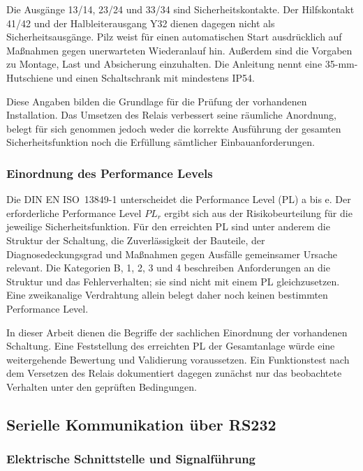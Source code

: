 Die Ausgänge 13/14, 23/24 und 33/34 sind Sicherheitskontakte. Der Hilfskontakt 41/42 und der Halbleiterausgang Y32 dienen dagegen nicht als Sicherheitsausgänge. Pilz weist für einen automatischen Start ausdrücklich auf Maßnahmen gegen unerwarteten Wiederanlauf hin. Außerdem sind die Vorgaben zu Montage, Last und Absicherung einzuhalten. Die Anleitung nennt eine 35-mm-Hutschiene und einen Schaltschrank mit mindestens IP54. \cite[Abschn.~Installation, Wiring und Connection]{pilz_pnoz_s4_grundlagen}

Diese Angaben bilden die Grundlage für die Prüfung der vorhandenen Installation. Das Umsetzen des Relais verbessert seine räumliche Anordnung, belegt für sich genommen jedoch weder die korrekte Ausführung der gesamten Sicherheitsfunktion noch die Erfüllung sämtlicher Einbauanforderungen.

\subsubsection{Einordnung des Performance Levels}

Die DIN EN ISO~13849-1 unterscheidet die Performance Level (PL) a bis e. Der erforderliche Performance Level $PL_r$ ergibt sich aus der Risikobeurteilung für die jeweilige Sicherheitsfunktion. Für den erreichten PL sind unter anderem die Struktur der Schaltung, die Zuverlässigkeit der Bauteile, der Diagnosedeckungsgrad und Maßnahmen gegen Ausfälle gemeinsamer Ursache relevant. Die Kategorien B, 1, 2, 3 und 4 beschreiben Anforderungen an die Struktur und das Fehlerverhalten; sie sind nicht mit einem PL gleichzusetzen. Eine zweikanalige Verdrahtung allein belegt daher noch keinen bestimmten Performance Level. \cite[Kap.~5, 7 und 8]{ifa_report_2025}

In dieser Arbeit dienen die Begriffe der sachlichen Einordnung der vorhandenen Schaltung. Eine Feststellung des erreichten PL der Gesamtanlage würde eine weitergehende Bewertung und Validierung voraussetzen. Ein Funktionstest nach dem Versetzen des Relais dokumentiert dagegen zunächst nur das beobachtete Verhalten unter den geprüften Bedingungen.

\subsection{Serielle Kommunikation über RS232}
\label{sec:grundlagen_rs232}

\subsubsection{Elektrische Schnittstelle und Signalführung}

